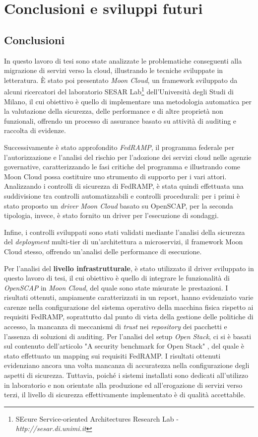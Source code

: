 \documentclass[../main.tex]{subfiles}
\begin{document}
\chapter{Conclusioni e sviluppi futuri}
\section {Conclusioni}
In questo lavoro di tesi sono state analizzate le problematiche conseguenti alla migrazione di servizi verso la cloud, illustrando le tecniche sviluppate in letteratura.
È stato poi presentato \textit{Moon Cloud}, un framework sviluppato da alcuni ricercatori del laboratorio SESAR Lab\footnote{SEcure Service-oriented Architectures Research Lab - \textit{http://sesar.di.unimi.it}} dell'Università degli Studi di Milano, il cui obiettivo è quello di implementare una metodologia automatica per la valutazione della sicurezza, delle performance e di altre proprietà non funzionali, offrendo un processo di assurance basato su attività di auditing e raccolta di evidenze.

Successivamente è stato approfondito \textit{FedRAMP}, il programma federale per l'autorizzazione e l'analisi del rischio per l'adozione dei servizi cloud nelle agenzie governative, caratterizzando le fasi critiche del programma e illustrando come Moon Cloud possa costituire uno strumento di supporto per i vari attori.
Analizzando i controlli di sicurezza di FedRAMP, è stata quindi effettuata una suddivisione tra controlli automatizzabili e controlli procedurali: per i primi è stato proposto un \textit{driver} \textit{Moon Cloud} basato su OpenSCAP, per la seconda tipologia, invece, è stato fornito un driver per l'esecuzione di sondaggi.

Infine, i controlli sviluppati sono stati validati mediante l'analisi della sicurezza del \textit{deployment} multi-tier di un'architettura a microservizi, il framework Moon Cloud stesso, offrendo un'analisi delle performance di esecuzione.

Per l'analisi del \textbf{livello infrastrutturale}, è stato utilizzato il driver sviluppato in questo lavoro di tesi, il cui obiettivo è quello di integrare le funzionalità di \textit{OpenSCAP} in \textit{Moon Cloud}, del quale sono state misurate le prestazioni. I risultati ottenuti, ampiamente caratterizzati in un report, hanno evidenziato varie carenze nella configurazione del sistema operativo della macchina fisica rispetto ai requisiti FedRAMP, soprattutto dal punto di vista della gestione delle politiche di accesso, la mancanza di meccanismi di \textit{trust} nei \textit{repository} dei pacchetti e l'assenza di soluzioni di auditing.
Per l'analisi del setup \textit{Open Stack}, ci si è basati sul contenuto dell'articolo "A security benchmark for Open Stack" \cite{MyPaper}, del quale è stato effettuato un mapping sui requisiti FedRAMP. I risultati ottenuti evidenziano ancora una volta mancanza di accuratezza nella configurazione degli aspetti di sicurezza. Tuttavia, poiché i sistemi installati sono dedicati all'utilizzo in laboratorio e non orientate alla produzione ed all'erogazione di servizi verso terzi, il livello di sicurezza effettivamente implementato è di qualità accettabile.
\end{document}
